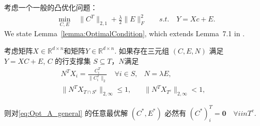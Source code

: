 \documentclass{ctexart}
\begin{document}
考虑一个一般的凸优化问题：
\begin{equation}\label{eq:Opt_A_general}
  \begin{aligned}
    \quad \min_{C, E} \; &\|C^T\|_{2,1}+\frac{\lambda}{2}\|E\|^2_F \quad &s.t. \quad Y=Xc+E.
  \end{aligned}
\end{equation}
We state Lemma~\ref{lemma:OptimalCondition}, which extends Lemma~7.1 in \cite{soltanolkotabi2011geometric}.
\begin{lemma}\label{lemma:OptimalCondition}
  考虑矩阵$X\in \mathbb{R}^{d\times n}$和矩阵$Y \in \mathbb{R}^{d\times n}$.
  如果存在三元组 $(C,E,N)$ 满足 $Y=XC+E$, $C$ 的行支撑集 $S\subseteq T$，$N$满足
  \begin{align*}
    N^T X_i = \frac{C^T_i}{\| C^T_i\|_2} \quad \forall i \in S,  & N=\lambda E, \\
    \|N^T X_{T\cap S^{c}}\|_{2, \infty} \leq 1, & \|N^T X_{T^{c}}\|_{2, \infty}<1,
  \end{align*}

  则对\eqref{eq:Opt_A_general} 的任意最优解 $(C^{*},E^{*})$ 必然有
  $(C^{*})^T_i=\mathbf{0} \quad \forall i in T^c$.
\end{lemma}
\end{document}
